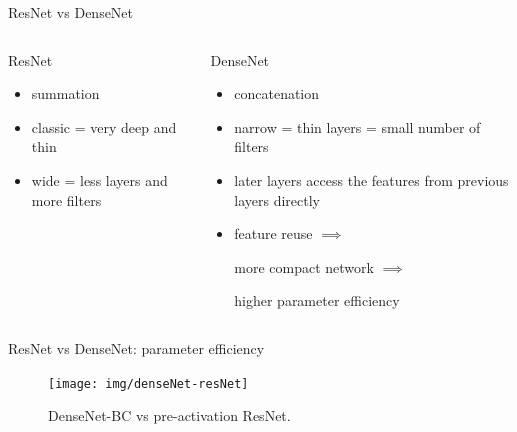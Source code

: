\documentclass{beamer}
\begin{document}
\begin{frame}{ResNet vs DenseNet}
\begin{columns}[t]
\begin{column}{0.5\textwidth}
ResNet
\begin{itemize}
\item summation
\item classic = very deep and thin
\item wide = less layers and more filters
\end{itemize}
\end{column}

\begin{column}{0.5\textwidth}
DenseNet
\begin{itemize}
\item concatenation
\item narrow = thin layers = small number of filters
\item later layers access the features from previous layers directly
\item feature reuse $\implies$ 

more compact network $\implies$

higher parameter efficiency
\end{itemize}
\end{column}
\end{columns}

\end{frame}
\begin{frame}{ResNet vs DenseNet: parameter efficiency}
\begin{figure}[h]
\texttt{[image: img/denseNet-resNet]}
\caption{DenseNet-BC vs pre-activation ResNet. \cite{cit:densenet}}
\end{figure}
\end{frame}
\end{document}
